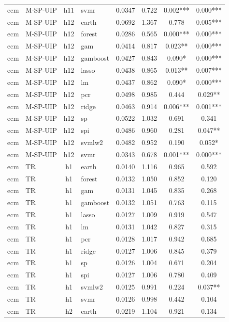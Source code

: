 \begin{ThreePartTable}
\begin{longtable}[t]{llclcccc}
ecm & M-SP-UIP & h11 & svmr & 0.0347 & 0.722 & 0.002*** & 0.000***\\
\addlinespace
ecm & M-SP-UIP & h12 & earth & 0.0692 & 1.367 & 0.778 & 0.005***\\
ecm & M-SP-UIP & h12 & forest & 0.0286 & 0.565 & 0.000*** & 0.000***\\
ecm & M-SP-UIP & h12 & gam & 0.0414 & 0.817 & 0.023** & 0.000***\\
ecm & M-SP-UIP & h12 & gamboost & 0.0427 & 0.843 & 0.090* & 0.000***\\
ecm & M-SP-UIP & h12 & lasso & 0.0438 & 0.865 & 0.013** & 0.007***\\
ecm & M-SP-UIP & h12 & lm & 0.0437 & 0.862 & 0.090* & 0.000***\\
ecm & M-SP-UIP & h12 & pcr & 0.0498 & 0.985 & 0.444 & 0.029**\\
ecm & M-SP-UIP & h12 & ridge & 0.0463 & 0.914 & 0.006*** & 0.001***\\
ecm & M-SP-UIP & h12 & sp & 0.0522 & 1.032 & 0.691 & 0.341\\
ecm & M-SP-UIP & h12 & spi & 0.0486 & 0.960 & 0.281 & 0.047**\\
ecm & M-SP-UIP & h12 & svmlw2 & 0.0482 & 0.952 & 0.190 & 0.052*\\
ecm & M-SP-UIP & h12 & svmr & 0.0343 & 0.678 & 0.001*** & 0.000***\\
\addlinespace
ecm & TR & h1 & earth & 0.0140 & 1.116 & 0.965 & 0.592\\
ecm & TR & h1 & forest & 0.0132 & 1.050 & 0.852 & 0.120\\
ecm & TR & h1 & gam & 0.0131 & 1.045 & 0.835 & 0.268\\
ecm & TR & h1 & gamboost & 0.0132 & 1.051 & 0.763 & 0.115\\
ecm & TR & h1 & lasso & 0.0127 & 1.009 & 0.919 & 0.547\\
ecm & TR & h1 & lm & 0.0131 & 1.042 & 0.827 & 0.315\\
ecm & TR & h1 & pcr & 0.0128 & 1.017 & 0.942 & 0.685\\
ecm & TR & h1 & ridge & 0.0127 & 1.006 & 0.845 & 0.379\\
ecm & TR & h1 & sp & 0.0126 & 1.004 & 0.671 & 0.204\\
ecm & TR & h1 & spi & 0.0127 & 1.006 & 0.780 & 0.409\\
ecm & TR & h1 & svmlw2 & 0.0125 & 0.991 & 0.224 & 0.037**\\
ecm & TR & h1 & svmr & 0.0126 & 0.998 & 0.442 & 0.104\\
\addlinespace
ecm & TR & h2 & earth & 0.0219 & 1.104 & 0.921 & 0.134\\

\end{longtable}
\end{ThreePartTable}

